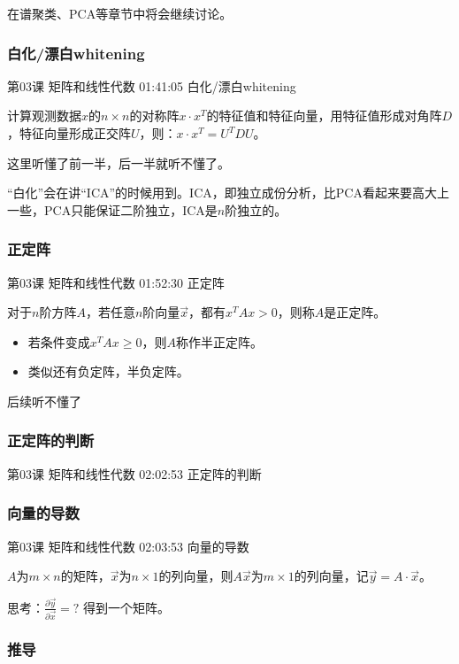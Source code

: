 \documentclass[UTF8]{ctexbook}
\begin{document}
在谱聚类、PCA等章节中将会继续讨论。

\subsubsection{白化/漂白whitening}

第03课 矩阵和线性代数 01:41:05 白化/漂白whitening

计算观测数据$x$的$n \times n$的对称阵$x \cdot x^{T}$的特征值和特征向量，用特征值形成对角阵$D$，特征向量形成正交阵$U$，则：$x \cdot x^{T} = U^{T}DU$。

这里听懂了前一半，后一半就听不懂了。

“白化”会在讲“ICA”的时候用到。ICA，即独立成份分析，比PCA看起来要高大上一些，PCA只能保证二阶独立，ICA是$n$阶独立的。

\subsubsection{正定阵}

第03课 矩阵和线性代数 01:52:30 正定阵

对于$n$阶方阵$A$，若任意$n$阶向量$\vec{x}$，都有$x^{T}Ax > 0$，则称$A$是正定阵。

\begin{itemize}
\item 若条件变成$x^{T}Ax \geq 0$，则$A$称作半正定阵。
\item 类似还有负定阵，半负定阵。
\end{itemize}

后续听不懂了

\subsubsection{正定阵的判断}

第03课 矩阵和线性代数 02:02:53 正定阵的判断

\subsubsection{向量的导数}

第03课 矩阵和线性代数 02:03:53 向量的导数

$A$为$m \times n$的矩阵，$\vec{x}$为$n \times 1$的列向量，则$A\vec{x}$为$m \times 1$的列向量，记$\vec{y}=A \cdot \vec{x}$。

思考：$\frac{\partial \vec{y}}{\partial \vec{x}}=?$ 得到一个矩阵。

\subsubsection{推导}
\end{document}
